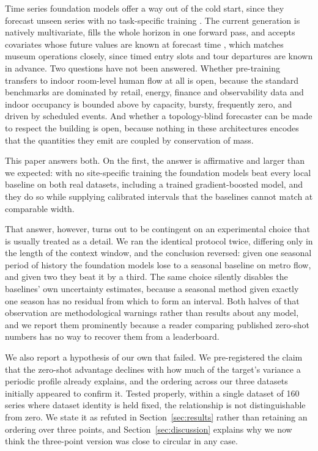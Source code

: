 \documentclass[11pt]{article}
\theoremstyle{plain}
\theoremstyle{definition}
\theoremstyle{remark}
\begin{document}
Time series foundation models offer a way out of the cold start, since they forecast unseen series with no task-specific training \citep{das2024timesfm,ansari2024chronos,woo2024moirai}. The current generation is natively multivariate, fills the whole horizon in one forward pass, and accepts covariates whose future values are known at forecast time \citep{timesfm3,ansari2025chronos2,khwaja2026toto2}, which matches museum operations closely, since timed entry slots and tour departures are known in advance. Two questions have not been answered. Whether pre-training transfers to indoor room-level human flow at all is open, because the standard benchmarks are dominated by retail, energy, finance and observability data \citep{aksu2024gifteval} and indoor occupancy is bounded above by capacity, bursty, frequently zero, and driven by scheduled events. And whether a topology-blind forecaster can be made to respect the building is open, because nothing in these architectures encodes that the quantities they emit are coupled by conservation of mass.

This paper answers both. On the first, the answer is affirmative and larger than we expected: with no site-specific training the foundation models beat every local baseline on both real datasets, including a trained gradient-boosted model, and they do so while supplying calibrated intervals that the baselines cannot match at comparable width.

That answer, however, turns out to be contingent on an experimental choice that is usually treated as a detail. We ran the identical protocol twice, differing only in the length of the context window, and the conclusion reversed: given one seasonal period of history the foundation models lose to a seasonal baseline on metro flow, and given two they beat it by a third. The same choice silently disables the baselines' own uncertainty estimates, because a seasonal method given exactly one season has no residual from which to form an interval. Both halves of that observation are methodological warnings rather than results about any model, and we report them prominently because a reader comparing published zero-shot numbers has no way to recover them from a leaderboard.

We also report a hypothesis of our own that failed. We pre-registered the claim that the zero-shot advantage declines with how much of the target's variance a periodic profile already explains, and the ordering across our three datasets initially appeared to confirm it. Tested properly, within a single dataset of \num{160} series where dataset identity is held fixed, the relationship is not distinguishable from zero. We state it as refuted in Section~\ref{sec:results} rather than retaining an ordering over three points, and Section~\ref{sec:discussion} explains why we now think the three-point version was close to circular in any case.
\end{document}
